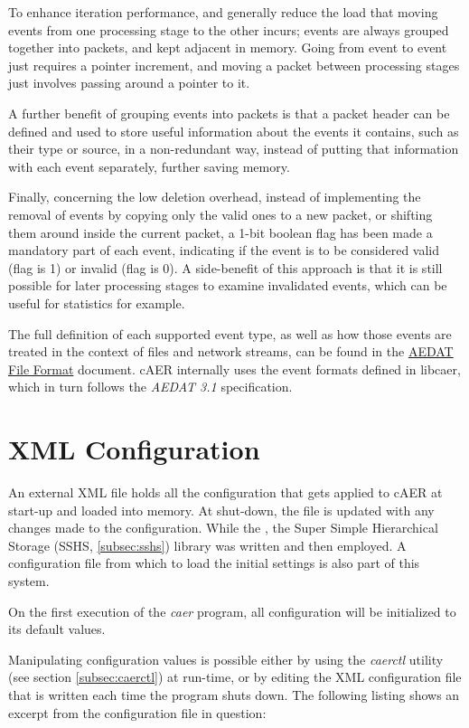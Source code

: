 \documentclass[a4paper,12pt]{report}
\begin{document}
To enhance iteration performance, and generally reduce the load that moving events from one processing stage to the other incurs; events are always grouped together into packets, and kept adjacent in memory. Going from event to event just requires a pointer increment, and moving a packet between processing stages just involves passing around a pointer to it.

A further benefit of grouping events into packets is that a packet header can be defined and used to store useful information about the events it contains, such as their type or source, in a non-redundant way, instead of putting that information with each event separately, further saving memory.

Finally, concerning the low deletion overhead, instead of implementing the removal of events by copying only the valid ones to a new packet, or shifting them around inside the current packet, a 1-bit boolean flag has been made a mandatory part of each event, indicating if the event is to be considered valid (flag is 1) or invalid (flag is 0). A side-benefit of this approach is that it is still possible for later processing stages to examine invalidated events, which can be useful for statistics for example.

The full definition of each supported event type, as well as how those events are treated in the context of files and network streams, can be found in the \href{https://inilabs.com/support/software/fileformat/#h.oqxw4mby5yg2}{AEDAT File Format} document. cAER internally uses the event formats defined in libcaer, which in turn follows the \emph{AEDAT 3.1} specification.

\section{XML Configuration} \label{sec:xml_configuration}

An external XML file holds all the configuration that gets applied to cAER at start-up and loaded into memory. At shut-down, the file is updated with any changes made to the configuration.
While the , the Super Simple Hierarchical Storage (SSHS, \ref{subsec:sshs}) library was written and then employed. A configuration file from which to load the initial settings is also part of this system.

On the first execution of the \emph{caer} program, all configuration will be initialized to its default values.

Manipulating configuration values is possible either by using the \emph{caerctl} utility (see section \ref{subsec:caerctl}) at run-time, or by editing the XML configuration file that is written each time the program shuts down.
\clearpage
The following listing shows an excerpt from the configuration file in question:
\end{document}
